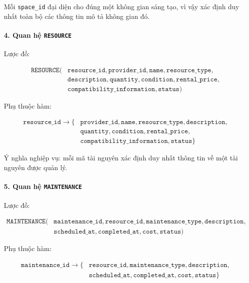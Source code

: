 Mỗi \texttt{space\_id} đại diện cho đúng một không gian sáng tạo, vì vậy xác định duy nhất toàn bộ các thông tin mô tả không gian đó.

\paragraph{4. Quan hệ \texttt{RESOURCE}}\mbox{}\par

Lược đồ:

$$
\begin{aligned}
\texttt{RESOURCE}( & \texttt{resource\_id}, \texttt{provider\_id}, \texttt{name}, \texttt{resource\_type}, \\
& \texttt{description}, \texttt{quantity}, \texttt{condition}, \texttt{rental\_price}, \\
& \texttt{compatibility\_information}, \texttt{status} )
\end{aligned}
$$

Phụ thuộc hàm:

$$
\begin{aligned}
\texttt{resource\_id} \rightarrow \{ & \texttt{provider\_id}, \texttt{name}, \texttt{resource\_type}, \texttt{description}, \\
& \texttt{quantity}, \texttt{condition}, \texttt{rental\_price}, \\
& \texttt{compatibility\_information}, \texttt{status} \}
\end{aligned}
$$

Ý nghĩa nghiệp vụ: mỗi mã tài nguyên xác định duy nhất thông tin về một tài nguyên được quản lý.

\paragraph{5. Quan hệ \texttt{MAINTENANCE}}\mbox{}\par

Lược đồ:

$$
\begin{aligned}
\texttt{MAINTENANCE}( & \texttt{maintenance\_id}, \texttt{resource\_id}, \texttt{maintenance\_type}, \texttt{description}, \\
& \texttt{scheduled\_at}, \texttt{completed\_at}, \texttt{cost}, \texttt{status} )
\end{aligned}
$$

Phụ thuộc hàm:

$$
\begin{aligned}
\texttt{maintenance\_id} \rightarrow \{ & \texttt{resource\_id}, \texttt{maintenance\_type}, \texttt{description}, \\
& \texttt{scheduled\_at}, \texttt{completed\_at}, \texttt{cost}, \texttt{status} \}
\end{aligned}
$$

